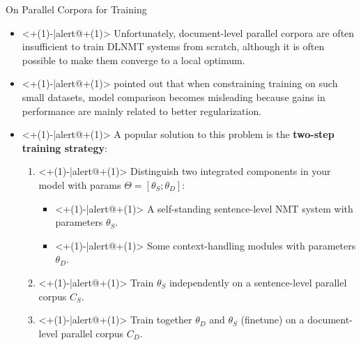 \begin{frame}{On Parallel Corpora for Training}
	\begin{itemize}
		\item<+(1)-|alert@+(1)> Unfortunately, document-level parallel corpora are often insufficient to train DLNMT systems from scratch, although it is often possible to make them converge to a local optimum. 
		\item<+(1)-|alert@+(1)> \cite{kim_when_2019} pointed out that when constraining training on such small datasets, model comparison becomes misleading because gains in performance are mainly related to better regularization.
		\item<+(1)-|alert@+(1)> A popular solution to this problem is the \textbf{two-step training strategy}: \cite{tu_learning_2017,voita_context-aware_2018,miculicich_document-level_2018}
		\begin{enumerate}
			\item<+(1)-|alert@+(1)> Distinguish two integrated components in your model with params $\Theta=[\theta_S;\theta_D]$:
				\begin{itemize}
					\item<+(1)-|alert@+(1)> A self-standing sentence-level NMT system with parameters $\theta_S$.
					\item<+(1)-|alert@+(1)> Some context-handling modules with parameters $\theta_D$.
				\end{itemize}
			\item<+(1)-|alert@+(1)> Train $\theta_S$ independently on a sentence-level parallel corpus $C_S$.
			\item<+(1)-|alert@+(1)> Train together $\theta_D$ and $\theta_S$ (finetune) on a document-level parallel corpus $C_D$.
		\end{enumerate}
	\end{itemize}
\end{frame}


